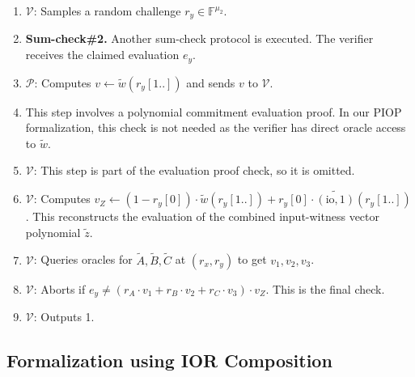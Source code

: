 \begin{description}
\begin{enumerate}
        \item $\mathcal{V}$: Samples a random challenge $r_y \in \mathbb{F}^{\mu_2}$.
        \item \textbf{Sum-check\#2.} Another sum-check protocol is executed. The verifier receives the claimed evaluation $e_y$.
        \item $\mathcal{P}$: Computes $v \leftarrow \tilde{w}(r_y[1..])$ and sends $v$ to $\mathcal{V}$.
        \item This step involves a polynomial commitment evaluation proof. In our PIOP formalization, this check is not needed as the verifier has direct oracle access to $\tilde{w}$.
        \item $\mathcal{V}$: This step is part of the evaluation proof check, so it is omitted.
        \item $\mathcal{V}$: Computes $v_Z \leftarrow (1 - r_y[0]) \cdot \tilde{w}(r_y[1..]) + r_y[0] \cdot \widetilde{(\text{io}, 1)}(r_y[1..])$. This reconstructs the evaluation of the combined input-witness vector polynomial $\tilde{z}$.
        \item $\mathcal{V}$: Queries oracles for $\tilde{A}, \tilde{B}, \tilde{C}$ at $(r_x, r_y)$ to get $v_1, v_2, v_3$.
        \item $\mathcal{V}$: Aborts if $e_y \neq (r_A \cdot v_1 + r_B \cdot v_2 + r_C \cdot v_3) \cdot v_Z$. This is the final check.
        \item $\mathcal{V}$: Outputs 1.
    \end{enumerate}
\end{description}

\subsection{Formalization using IOR Composition}
